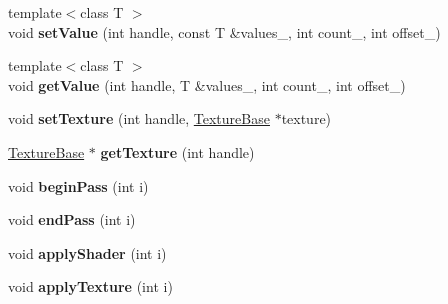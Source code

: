 \begin{DoxyCompactItemize}
\item 
{\footnotesize template$<$class T $>$ }\\void {\bfseries set\+Value} (int handle, const T \&values\+\_\+, int count\+\_, int offset\+\_)\hypertarget{class_i_dream_sky_1_1_visual_effect_a245f31d740b62a852fe9b89a4f15cad0}{}\label{class_i_dream_sky_1_1_visual_effect_a245f31d740b62a852fe9b89a4f15cad0}

\item 
{\footnotesize template$<$class T $>$ }\\void {\bfseries get\+Value} (int handle, T \&values\+\_\+, int count\+\_, int offset\+\_)\hypertarget{class_i_dream_sky_1_1_visual_effect_ae4c038c9d9fcfca881bb8ca44b944fb0}{}\label{class_i_dream_sky_1_1_visual_effect_ae4c038c9d9fcfca881bb8ca44b944fb0}

\item 
void {\bfseries set\+Texture} (int handle, \hyperlink{class_i_dream_sky_1_1_texture_base}{Texture\+Base} $\ast$texture)\hypertarget{class_i_dream_sky_1_1_visual_effect_abbdecc24dc3c84049e637a9deb8bcf40}{}\label{class_i_dream_sky_1_1_visual_effect_abbdecc24dc3c84049e637a9deb8bcf40}

\item 
\hyperlink{class_i_dream_sky_1_1_texture_base}{Texture\+Base} $\ast$ {\bfseries get\+Texture} (int handle)\hypertarget{class_i_dream_sky_1_1_visual_effect_adec9955a42b03c51cc4c4c6001548d84}{}\label{class_i_dream_sky_1_1_visual_effect_adec9955a42b03c51cc4c4c6001548d84}

\item 
void {\bfseries begin\+Pass} (int i)\hypertarget{class_i_dream_sky_1_1_visual_effect_af84cafa2f98076d1cf21fc95db74d83e}{}\label{class_i_dream_sky_1_1_visual_effect_af84cafa2f98076d1cf21fc95db74d83e}

\item 
void {\bfseries end\+Pass} (int i)\hypertarget{class_i_dream_sky_1_1_visual_effect_ac13ed856d843c21114efc019eb34004f}{}\label{class_i_dream_sky_1_1_visual_effect_ac13ed856d843c21114efc019eb34004f}

\item 
void {\bfseries apply\+Shader} (int i)\hypertarget{class_i_dream_sky_1_1_visual_effect_a0a54bcd53c4f312ceb6ee9c847acd5c8}{}\label{class_i_dream_sky_1_1_visual_effect_a0a54bcd53c4f312ceb6ee9c847acd5c8}

\item 
void {\bfseries apply\+Texture} (int i)\hypertarget{class_i_dream_sky_1_1_visual_effect_a80ea4314d2da6aee5b70d2bc3e724b03}{}\label{class_i_dream_sky_1_1_visual_effect_a80ea4314d2da6aee5b70d2bc3e724b03}


\end{DoxyCompactItemize}
